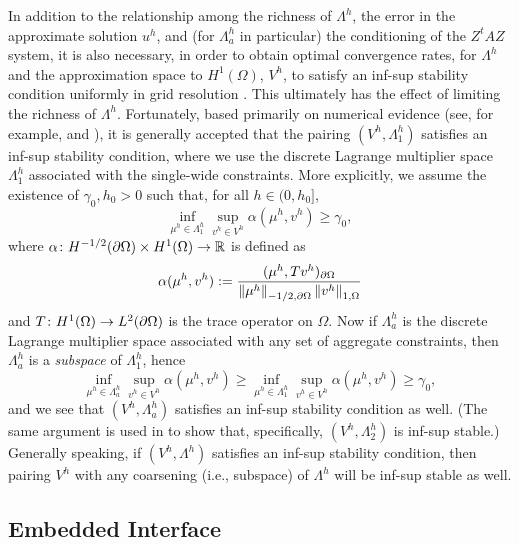 In addition to the relationship among the richness of $\Lambda^h$, the error in the approximate solution $u^h$, and (for $\Lambda^h_a$ in particular) the conditioning of the $Z^tAZ$ system, it is also necessary, in order to obtain optimal convergence rates, for $\Lambda^h$ and the approximation space to $H^1(\Omega)$, $V^h$, to satisfy an inf-sup stability condition uniformly in grid resolution \cite{Pitkaranta79}. This ultimately has the effect of limiting the richness of $\Lambda^h$. Fortunately, based primarily on numerical evidence (see, for example, \cite{Vaughan06} and \cite{Mourad07}), it is generally accepted that the pairing $(V^h, \Lambda^h_1)$ satisfies an inf-sup stability condition, where we use the discrete Lagrange multiplier space $\Lambda^h_1$ associated with the single-wide constraints. More explicitly, we assume the existence of $\gamma_0, h_0 > 0$ such that, for all $h \in (0, h_0]$,
\begin{equation*}
\inf_{\mu^h \in \Lambda^h_1} \sup_{v^h \in V^h} \alpha(\mu^h, v^h) \geq \gamma_0,
\end{equation*}
where $\alpha \colon H^{-1/2}(\partial\Omega) \times H^1(\Omega) \to \mathbb{R}$ is defined as
\begin{equation*}
\alpha(\mu^h, v^h) := \frac{(\mu^h, T v^h)_{\partial\Omega}}{\left\lVert \mu^h \right\rVert_{-1/2,\partial\Omega} \left\lVert v^h \right\rVert_{1,\Omega}}
\end{equation*}
and $T \colon H^1(\Omega) \to L^2(\partial\Omega)$ is the trace operator on $\Omega$. Now if $\Lambda^h_a$ is the discrete Lagrange multiplier space associated with any set of aggregate constraints, then $\Lambda^h_a$ is a \emph{subspace} of $\Lambda^h_1$, hence
\begin{equation*}
\inf_{\mu^h \in \Lambda^h_a} \sup_{v^h \in V^h} \alpha(\mu^h, v^h) \geq
\inf_{\mu^h \in \Lambda^h_1} \sup_{v^h \in V^h} \alpha(\mu^h, v^h) \geq
\gamma_0,
\end{equation*}
and we see that $(V^h, \Lambda^h_a)$ satisfies an inf-sup stability condition as well. (The same argument is used in \cite{Bedrossian10} to show that, specifically, $(V^h, \Lambda^h_2)$ is inf-sup stable.) Generally speaking, if $(V^h, \Lambda^h)$ satisfies an inf-sup stability condition, then pairing $V^h$ with any coarsening (i.e., subspace) of $\Lambda^h$ will be inf-sup stable as well.

\subsection{Embedded Interface} \label{subsec:chap4.discretization.interface}

